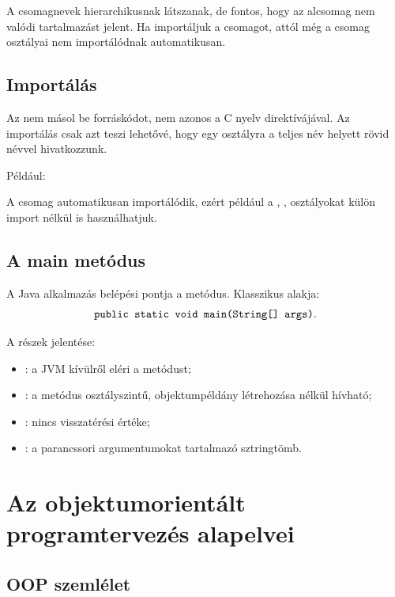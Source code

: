 A csomagnevek hierarchikusnak látszanak, de fontos, hogy az alcsomag nem valódi tartalmazást jelent. Ha importáljuk a  csomagot, attól még a  csomag osztályai nem importálódnak automatikusan.

\subsection{Importálás}

Az  nem másol be forráskódot, nem azonos a C nyelv  direktívájával. Az importálás csak azt teszi lehetővé, hogy egy osztályra a teljes név helyett rövid névvel hivatkozzunk.

Például:


A  csomag automatikusan importálódik, ezért például a , ,  osztályokat külön import nélkül is használhatjuk.

\subsection{A main metódus}

A Java alkalmazás belépési pontja a  metódus. Klasszikus alakja:
\[
  \texttt{public static void main(String[] args)}.
\]

A részek jelentése:

\begin{itemize}
  \item {}: a JVM kívülről eléri a metódust;
  \item {}: a metódus osztályszintű, objektumpéldány létrehozása nélkül hívható;
  \item {}: nincs visszatérési értéke;
  \item {}: a parancssori argumentumokat tartalmazó sztringtömb.
\end{itemize}

\section{Az objektumorientált programtervezés alapelvei}

\subsection{OOP szemlélet}


